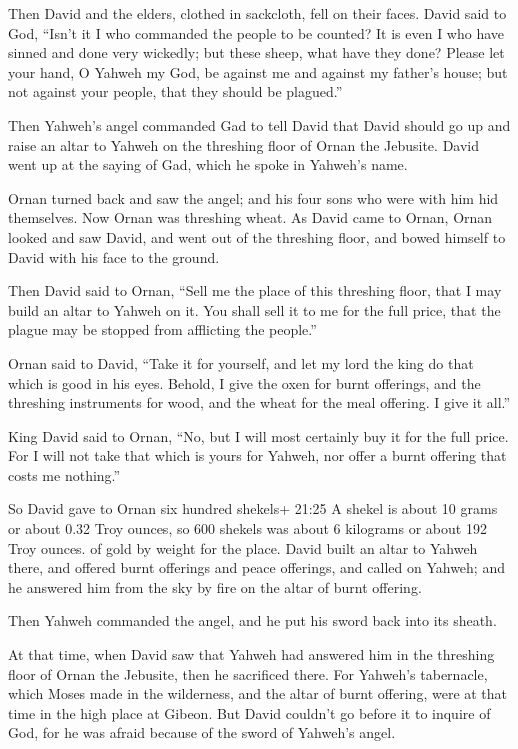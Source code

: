 Then David and the elders, clothed in sackcloth, fell on their faces.
 David said to God, ``Isn't it I who commanded the people
to be counted? It is even I who have sinned and done very wickedly; but
these sheep, what have they done? Please let your hand, O Yahweh my God,
be against me and against my father's house; but not against your
people, that they should be plagued.''

 Then Yahweh's angel commanded Gad to tell David that David
should go up and raise an altar to Yahweh on the threshing floor of
Ornan the Jebusite.  David went up at the saying of Gad,
which he spoke in Yahweh's name.

 Ornan turned back and saw the angel; and his four sons who
were with him hid themselves. Now Ornan was threshing wheat.
 As David came to Ornan, Ornan looked and saw David, and
went out of the threshing floor, and bowed himself to David with his
face to the ground.

 Then David said to Ornan, ``Sell me the place of this
threshing floor, that I may build an altar to Yahweh on it. You shall
sell it to me for the full price, that the plague may be stopped from
afflicting the people.''

 Ornan said to David, ``Take it for yourself, and let my
lord the king do that which is good in his eyes. Behold, I give the oxen
for burnt offerings, and the threshing instruments for wood, and the
wheat for the meal offering. I give it all.''

 King David said to Ornan, ``No, but I will most certainly
buy it for the full price. For I will not take that which is yours for
Yahweh, nor offer a burnt offering that costs me nothing.''

 So David gave to Ornan six hundred shekels+ 21:25 A shekel
is about 10 grams or about 0.32 Troy ounces, so 600 shekels was about 6
kilograms or about 192 Troy ounces. of gold by weight for the place.
 David built an altar to Yahweh there, and offered burnt
offerings and peace offerings, and called on Yahweh; and he answered him
from the sky by fire on the altar of burnt offering.

 Then Yahweh commanded the angel, and he put his sword back
into its sheath.

 At that time, when David saw that Yahweh had answered him
in the threshing floor of Ornan the Jebusite, then he sacrificed there.
 For Yahweh's tabernacle, which Moses made in the
wilderness, and the altar of burnt offering, were at that time in the
high place at Gibeon.  But David couldn't go before it to
inquire of God, for he was afraid because of the sword of Yahweh's
angel.

